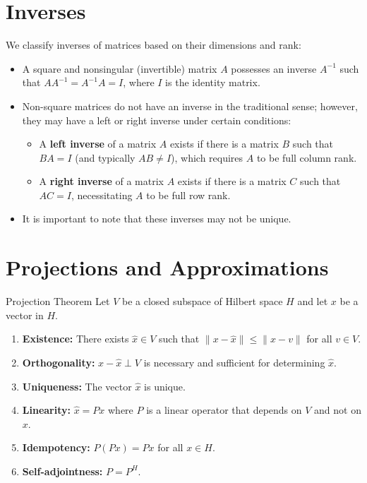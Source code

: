 \section{Inverses}
 We classify inverses of matrices based on their dimensions and rank:

\begin{itemize}
    \item A square and nonsingular (invertible) matrix $A$ possesses an inverse $A^{-1}$ such that $AA^{-1} = A^{-1}A = I$, where $I$ is the identity matrix.
    \item Non-square matrices do not have an inverse in the traditional sense; however, they may have a left or right inverse under certain conditions:
    \begin{itemize}
        \item A \textbf{left inverse} of a matrix $A$ exists if there is a matrix $B$ such that $BA = I$ (and typically $AB \neq I$), which requires $A$ to be full column rank.
        \item A \textbf{right inverse} of a matrix $A$ exists if there is a matrix $C$ such that $AC = I$, necessitating $A$ to be full row rank.
    \end{itemize}
    \item It is important to note that these inverses may not be unique.
\end{itemize}


 
\section{Projections and Approximations}
\begin{theorembox}{Projection Theorem}
Let \( V \) be a closed subspace of Hilbert space \( H \) and let \( x \) be a vector in \( H \).
\begin{enumerate}
  \item \textbf{Existence:} There exists \( \hat{x} \in V \) such that \( \|x - \hat{x}\| \leq \|x - v\| \) for all \( v \in V \).
  \item \textbf{Orthogonality:} \( x - \hat{x} \perp V \) is necessary and sufficient for determining \( \hat{x} \).
  \item \textbf{Uniqueness:} The vector \( \hat{x} \) is unique.
  \item \textbf{Linearity:} \( \hat{x} = Px \) where \( P \) is a linear operator that depends on \( V \) and not on \( x \).
  \item \textbf{Idempotency:} \( P(Px) = Px \) for all \( x \in H \).
  \item \textbf{Self-adjointness:} \( P = P^H \).
\end{enumerate}
\end{theorembox}

